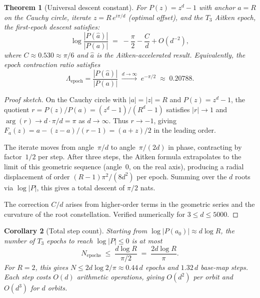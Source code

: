\documentclass[10pt,a4paper,oneside]{book}
\newtheorem{theorem}{Theorem}[chapter]
\newtheorem{corollary}[theorem]{Corollary}
\theoremstyle{definition}
\theoremstyle{remark}
\begin{document}
\begin{theorem}[Universal descent constant]
\label{thm:universal_descent}
For $P(z) = z^d - 1$ with anchor $a = R$ on the Cauchy circle, iterate $z = R\,e^{i\pi/d}$ (optimal offset), and the $T_3$ Aitken epoch, the first-epoch descent satisfies:
\begin{equation}
  \label{eq:universal_descent}
  \log \frac{|P(\hat{a})|}{|P(a)|} \;=\; -\frac{\pi}{2} - \frac{C}{d} + O(d^{-2}),
\end{equation}
where $C \approx 0.530 \approx \pi/6$ and $\hat{a}$ is the Aitken-accelerated result.  Equivalently, the epoch contraction ratio satisfies
\[
  \Lambda_{\mathrm{epoch}} = \frac{|P(\hat{a})|}{|P(a)|} \;\xrightarrow{d\to\infty}\; e^{-\pi/2} \;\approx\; 0.20788.
\]
\end{theorem}

\begin{proof}[Proof sketch]
On the Cauchy circle with $|a| = |z| = R$ and $P(z) = z^d - 1$, the quotient $r = P(z)/P(a) = (z^d-1)/(R^d-1)$ satisfies $|r| \to 1$ and $\arg(r) \to d \cdot \pi/d = \pi$ as $d \to \infty$.  Thus $r \to -1$, giving $F_a(z) = a - (z-a)/(r-1) = (a+z)/2$ in the leading order.

The iterate moves from angle~$\pi/d$ to angle~$\pi/(2d)$ in phase, contracting by factor~$1/2$ per step.  After three steps, the Aitken formula extrapolates to the limit of this geometric sequence (angle~$0$, on the real axis), producing a radial displacement of order $(R-1)\pi^2/(8d^2)$ per epoch.  Summing over the $d$ roots via $\log|P|$, this gives a total descent of $\pi/2$ nats.

The correction $C/d$ arises from higher-order terms in the geometric series and the curvature of the root constellation.  Verified numerically for $3 \leq d \leq 5000$.
\end{proof}

\begin{corollary}[Total step count]
\label{cor:total_steps}
Starting from $\log|P(a_0)| \approx d\log R$, the number of $T_3$ epochs to reach $\log|P| \leq 0$ is at most
\[
  N_{\mathrm{epochs}} \;\leq\; \frac{d\log R}{\pi/2} \;=\; \frac{2d\log R}{\pi}.
\]
For $R = 2$, this gives $N \leq 2d\log 2/\pi \approx 0.44\,d$ epochs and $1.32\,d$ base-map steps.  Each step costs $O(d)$ arithmetic operations, giving $O(d^2)$ per orbit and $O(d^3)$ for $d$ orbits.
\end{corollary}
\end{document}

